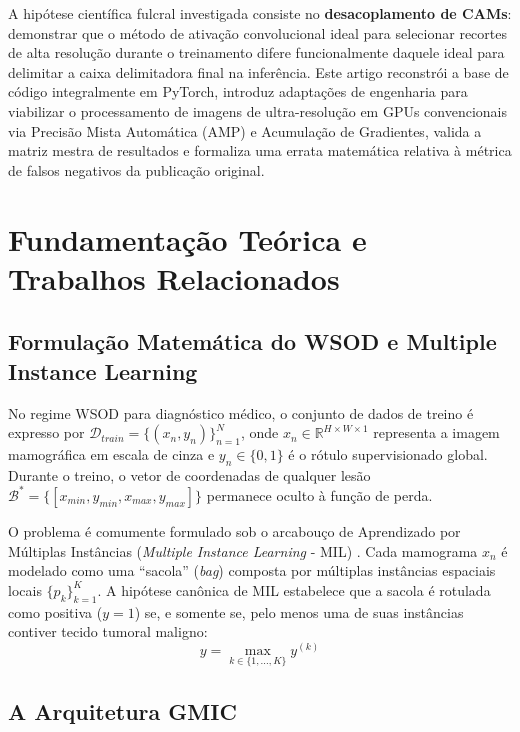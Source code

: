 \documentclass[12pt]{article}
\begin{document}
A hipótese científica fulcral investigada consiste no \textbf{desacoplamento de CAMs}: demonstrar que o método de ativação convolucional ideal para selecionar recortes de alta resolução durante o treinamento difere funcionalmente daquele ideal para delimitar a caixa delimitadora final na inferência. Este artigo reconstrói a base de código integralmente em PyTorch, introduz adaptações de engenharia para viabilizar o processamento de imagens de ultra-resolução em GPUs convencionais via Precisão Mista Automática (AMP) e Acumulação de Gradientes, valida a matriz mestra de resultados e formaliza uma errata matemática relativa à métrica de falsos negativos da publicação original.

\section{Fundamentação Teórica e Trabalhos Relacionados}

\subsection{Formulação Matemática do WSOD e Multiple Instance Learning}

No regime WSOD para diagnóstico médico, o conjunto de dados de treino é expresso por $\mathcal{D}_{train} = \{(x_n, y_n)\}_{n=1}^N$, onde $x_n \in \mathbb{R}^{H \times W \times 1}$ representa a imagem mamográfica em escala de cinza e $y_n \in \{0, 1\}$ é o rótulo supervisionado global. Durante o treino, o vetor de coordenadas de qualquer lesão $\mathcal{B}^* = \{[x_{min}, y_{min}, x_{max}, y_{max}]\}$ permanece oculto à função de perda.

O problema é comumente formulado sob o arcabouço de Aprendizado por Múltiplas Instâncias (\textit{Multiple Instance Learning} - MIL) \cite{ilse2018attention}. Cada mamograma $x_n$ é modelado como uma ``sacola'' (\textit{bag}) composta por múltiplas instâncias espaciais locais $\{p_k\}_{k=1}^K$. A hipótese canônica de MIL estabelece que a sacola é rotulada como positiva ($y=1$) se, e somente se, pelo menos uma de suas instâncias contiver tecido tumoral maligno:
\begin{equation}
y = \max_{k \in \{1, \dots, K\}} y^{(k)}
\end{equation}

\subsection{A Arquitetura GMIC}
\end{document}
